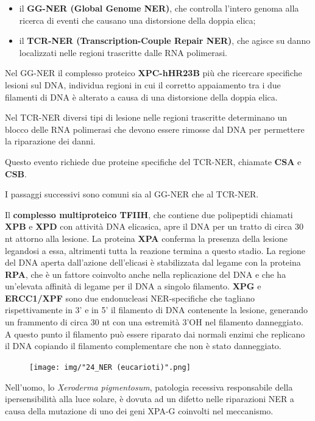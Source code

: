 \documentclass[11pt]{book}
\begin{document}
\begin{itemize}
\itemsep1pt\parskip0pt
\item
  il \textbf{GG-NER (Global Genome NER)}, che controlla l'intero genoma
  alla ricerca di eventi che causano una distorsione della doppia elica;
\item
  il \textbf{TCR-NER (Transcription-Couple Repair NER)}, che agisce su
  danno localizzati nelle regioni trascritte dalle RNA polimerasi.
\end{itemize}

Nel GG-NER il complesso proteico \textbf{XPC-hHR23B} più che ricercare
specifiche lesioni sul DNA, individua regioni in cui il corretto
appaiamento tra i due filamenti di DNA è alterato a causa di una
distorsione della doppia elica.

Nel TCR-NER diversi tipi di lesione nelle regioni trascritte determinano
un blocco delle RNA polimerasi che devono essere rimosse dal DNA per
permettere la riparazione dei danni.

Questo evento richiede due proteine specifiche del TCR-NER, chiamate
\textbf{CSA} e \textbf{CSB}.

I passaggi successivi sono comuni sia al GG-NER che al TCR-NER.

Il \textbf{complesso multiproteico TFIIH}, che contiene due polipeptidi
chiamati \textbf{XPB} e \textbf{XPD} con attività DNA elicasica, apre il
DNA per un tratto di circa 30 nt attorno alla lesione. La proteina
\textbf{XPA} conferma la presenza della lesione legandosi a essa,
altrimenti tutta la reazione termina a questo stadio. La regione del DNA
aperta dall'azione dell'elicasi è stabilizzata dal legame con la
proteina \textbf{RPA}, che è un fattore coinvolto anche nella
replicazione del DNA e che ha un'elevata affinità di legame per il DNA a
singolo filamento. \textbf{XPG} e \textbf{ERCC1/XPF} sono due
endonucleasi NER-specifiche che tagliano rispettivamente in 3' e in 5'
il filamento di DNA contenente la lesione, generando un frammento di
circa 30 nt con una estremità 3'OH nel filamento danneggiato. A questo
punto il filamento può essere riparato dai normali enzimi che replicano
il DNA copiando il filamento complementare che non è stato danneggiato.

\begin{figure}[htp]
\centering
\texttt{[image: img/"24\_NER (eucarioti)".png]}
\caption{}
\label{ner-eucarioti}
\end{figure}

Nell'uomo, lo \emph{Xeroderma pigmentosum}, patologia recessiva
responsabile della ipersensibilità alla luce solare, è dovuta ad un
difetto nelle riparazioni NER a causa della mutazione di uno dei geni
XPA-G coinvolti nel meccanismo.
\end{document}
